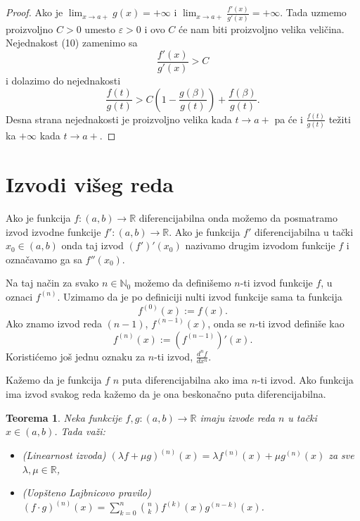 \documentclass[a4paper,12pt]{article}
\theoremstyle{plain}
\newtheorem{theorem}{Teorema}[section]
\theoremstyle{definition}
\theoremstyle{remark}
\begin{document}
\begin{proof}
Ako je $\lim_{x \to a+} g(x) = +\infty$ i $\lim_{x \to a+} \frac{f'(x)}{g'(x)} = +\infty$. Tada uzmemo proizvoljno $C > 0$ umesto $\varepsilon > 0$ i ovo $C$ će nam biti proizvoljno velika veličina. Nejednakost (10) zamenimo sa
$$
\frac{f'(x)}{g'(x)} > C
$$
i dolazimo do nejednakosti
$$
\frac{f(t)}{g(t)} > C \left(1 - \frac{g(\beta)}{g(t)}\right) + \frac{f(\beta)}{g(t)}.
$$
Desna strana nejednakosti je proizvoljno velika kada $t \to a+$ pa će i $\frac{f(t)}{g(t)}$ težiti ka $+\infty$ kada $t \to a+$.
\end{proof}

\section{Izvodi višeg reda}

Ako je funkcija $f: (a, b) \to \mathbb{R}$ diferencijabilna onda možemo da posmatramo izvod izvodne funkcije $f': (a, b) \to \mathbb{R}$. Ako je funkcija $f'$ diferencijabilna u tački $x_0 \in (a, b)$ onda taj izvod $(f')'(x_0)$ nazivamo drugim izvodom funkcije $f$ i označavamo ga sa $f''(x_0)$.

Na taj način za svako $n \in \mathbb{N}_0$ možemo da definišemo $n$-ti izvod funkcije $f$, u oznaci $f^{(n)}$. Uzimamo da je po definiciji nulti izvod funkcije sama ta funkcija
$$
f^{(0)}(x) := f(x).
$$
Ako znamo izvod reda $(n - 1)$, $f^{(n-1)}(x)$, onda se $n$-ti izvod definiše kao
$$
f^{(n)}(x) := (f^{(n-1)})'(x).
$$
Koristićemo još jednu oznaku za $n$-ti izvod, $\frac{d^n f}{dx^n}$.

Kažemo da je funkcija $f$ $n$ puta diferencijabilna ako ima $n$-ti izvod. Ako funkcija ima izvod svakog reda kažemo da je ona beskonačno puta diferencijabilna.

\begin{theorem}
Neka funkcije $f, g: (a, b) \to \mathbb{R}$ imaju izvode reda $n$ u tački $x \in (a, b)$. Tada važi:
\begin{itemize}
    \item (Linearnost izvoda) $(\lambda f + \mu g)^{(n)}(x) = \lambda f^{(n)}(x) + \mu g^{(n)}(x)$ za sve $\lambda, \mu \in \mathbb{R}$,
    \item (Uopšteno Lajbnicovo pravilo) $(f \cdot g)^{(n)}(x) = \sum_{k=0}^{n} \binom{n}{k} f^{(k)}(x) g^{(n-k)}(x)$.
\end{itemize}
\end{theorem}
\end{document}
